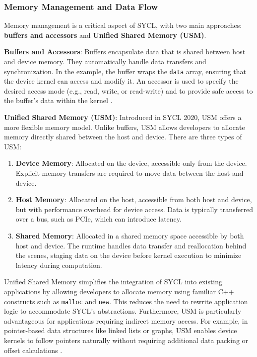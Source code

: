 \subsubsection{Memory Management and Data Flow}
\label{sec:sycl_memory}

Memory management is a critical aspect of SYCL, with two main approaches: \textbf{buffers and accessors} and \textbf{Unified Shared
Memory (USM)}.

\textbf{Buffers and Accessors}: Buffers encapsulate data that is shared between host and device memory. They automatically handle
data transfers and synchronization. In the example, the buffer wraps the \texttt{data} array, ensuring that the device kernel can
access and modify it. An accessor is used to specify the desired access mode (e.g., read, write, or read-write) and to provide safe
access to the buffer's data within the kernel \cite{SYCL2020}.

\textbf{Unified Shared Memory (USM)}: Introduced in SYCL 2020, USM offers a more flexible memory model. Unlike buffers, USM allows
developers to allocate memory directly shared between the host and device. There are three types of USM:
\begin{enumerate}
    \item \textbf{Device Memory}: Allocated on the device, accessible only from the device. Explicit memory transfers are required to
    move data between the host and device.
    \item \textbf{Host Memory}: Allocated on the host, accessible from both host and device, but with performance overhead for device
    access. Data is typically transferred over a bus, such as PCIe, which can introduce latency.
    \item \textbf{Shared Memory}: Allocated in a shared memory space accessible by both host and device. The runtime handles data
    transfer and reallocation behind the scenes, staging data on the device before kernel execution to minimize latency during
    computation.
\end{enumerate}

Unified Shared Memory simplifies the integration of SYCL into existing applications by allowing developers to allocate memory using
familiar C++ constructs such as \texttt{malloc} and \texttt{new}. This reduces the need to rewrite application logic to accommodate
SYCL’s abstractions. Furthermore, USM is particularly advantageous for applications requiring indirect memory access. For example, in
pointer-based data structures like linked lists or graphs, USM enables device kernels to follow pointers naturally without requiring
additional data packing or offset calculations \cite{reinders2020data, SYCL2020}.



